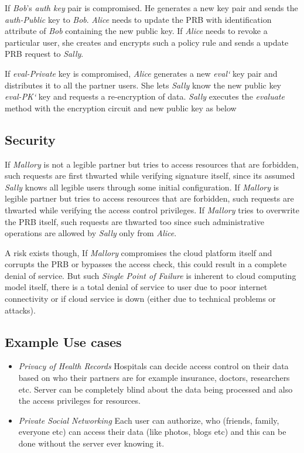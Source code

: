 \documentclass[conference]{IEEEtran}
\numberwithin{equation}{section}
\begin{document}
If \emph{Bob}'s \emph{auth key} pair is compromised. He generates a new key pair and sends the \emph{auth-Public} key to \emph{Bob}. \emph{Alice} needs to update the PRB with identification attribute of \emph{Bob} containing the new public key.
If \emph{Alice} needs to revoke a particular user, she creates and encrypts such a policy rule and sends a update PRB request to \emph{Sally}.

If \emph{eval-Private} key is compromised, \emph{Alice} generates a new \emph{eval`} key  pair and distributes it to all the partner users. She lets \emph{Sally} know the new public key \emph{eval-PK`} key and requests a re-encryption of data. \emph{Sally} executes the \emph{evaluate} method with the encryption circuit and new public key as below 

\subsection{Security}

If \emph{Mallory} is not a legible partner but tries to access resources that are forbidden, such requests are first thwarted while verifying signature itself, since its assumed \emph{Sally} knows all legible users through some initial configuration.
If \emph{Mallory} is legible partner but tries to access resources that are forbidden, such requests are thwarted while verifying the access control privileges. If \emph{Mallory} tries to overwrite the PRB itself, such requests are thwarted too since such administrative operations are allowed by \emph{Sally} only from \emph{Alice}. 

A risk exists though, If \emph{Mallory} compromises the cloud platform itself and corrupts the PRB or bypasses the access check, this could result in a complete denial of service. But such \emph{Single Point of Failure} is inherent to cloud computing model itself, there is a total denial of service to user due to poor internet connectivity or if cloud service is down (either due to technical problems or attacks).
\subsection{Example Use cases}
   \begin{itemize}
\item \emph{Privacy of Health Records} Hospitals can decide access control on  their data based on who their partners are for example insurance, doctors, researchers etc. Server can be completely blind about the data being processed and also the access privileges for resources.
\item \emph{Private Social Networking} Each user can authorize, who (friends, family, everyone etc) can access their data (like photos, blogs etc) and this can be done without the server ever knowing it.
\end{itemize}
\end{document}
